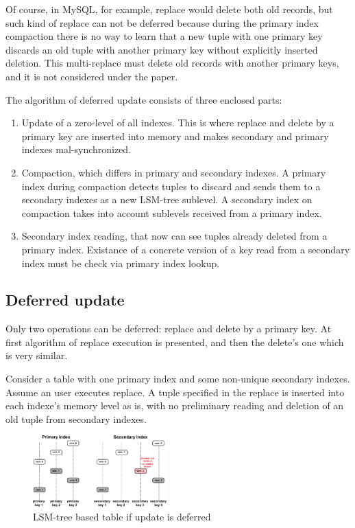 \documentclass{vldb}
\begin{document}
Of course, in MySQL, for example, replace would delete both old records, but
such kind of replace can not be deferred because during the primary index
compaction there is no way to learn that a new tuple with one primary key
discards an old tuple with another primary key without explicitly inserted
deletion. This multi-replace must delete old records with another primary keys,
and it is not considered under the paper.

The algorithm of deferred update consists of three enclosed parts:
\begin{enumerate}
\item Update of a zero-level of all indexes. This is where replace and delete by
a primary key are inserted into memory and makes secondary and primary indexes
mal-synchronized.
\item Compaction, which differs in primary and secondary indexes. A primary
index during compaction detects tuples to discard and sends them to a secondary
indexes as a new LSM-tree sublevel. A secondary index on compaction takes into
account sublevels received from a primary index.
\item Secondary index reading, that now can see tuples already deleted from a
primary index. Existance of a concrete version of a key read from a secondary
index must be check via primary index lookup.
\end{enumerate}

\subsection{Deferred update}
Only two operations can be deferred: replace and delete by a primary key. At
first algorithm of replace execution is presented, and then the delete's one
which is very similar.

Consider a table with one primary index and some non-unique secondary indexes.
Assume an user executes replace. A tuple specified in the replace is inserted
into each indexe's memory level as is, with no preliminary reading and deletion
of an old tuple from secondary indexes.
\begin{figure}
\centering
\includegraphics[width=0.46\textwidth]{table_after_deferred_update}
\caption{LSM-tree based table if update is deferred}
\label{fig:table_after_deferred_update}
\end{figure}
\end{document}
